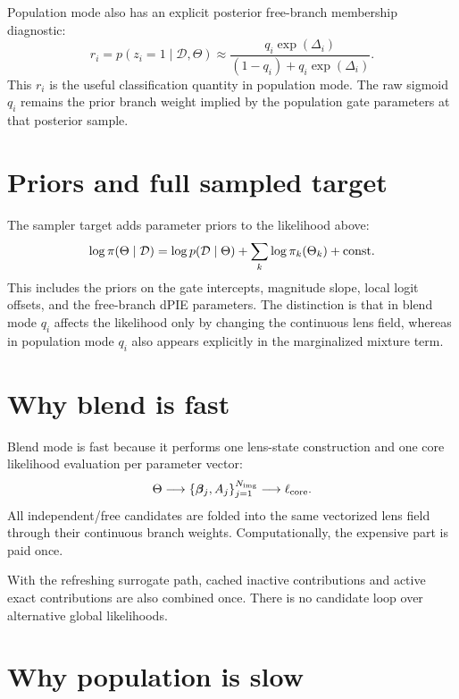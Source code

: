 \documentclass[11pt]{article}
\newcommand{\data}{\mathcal{D}}
\begin{document}
Population mode also has an explicit posterior free-branch membership
diagnostic:
\[
    r_i
    =
    p(z_i=1\mid\data,\Theta)
    \approx
    \frac{
        q_i\exp(\Delta_i)
    }{
        (1-q_i)+q_i\exp(\Delta_i)
    }.
\]
This $r_i$ is the useful classification quantity in population mode. The raw
sigmoid $q_i$ remains the prior branch weight implied by the population gate
parameters at that posterior sample.

\section{Priors and full sampled target}

The sampler target adds parameter priors to the likelihood above:
\[
    \log \pi(\Theta\mid\data)
    =
    \log p(\data\mid\Theta)
    +
    \sum_k \log \pi_k(\Theta_k)
    +
    {\rm const}.
\]
This includes the priors on the gate intercepts, magnitude slope, local logit
offsets, and the free-branch dPIE parameters. The distinction is that in blend
mode $q_i$ affects the likelihood only by changing the continuous lens field,
whereas in population mode $q_i$ also appears explicitly in the marginalized
mixture term.

\section{Why blend is fast}

Blend mode is fast because it performs one lens-state construction and one
core likelihood evaluation per parameter vector:
\[
    \Theta
    \longrightarrow
    \{\bm{\beta}_j,A_j\}_{j=1}^{N_{\rm img}}
    \longrightarrow
    \ell_{\rm core}.
\]
All independent/free candidates are folded into the same vectorized lens field
through their continuous branch weights. Computationally, the expensive part is
paid once.

With the refreshing surrogate path, cached inactive contributions and active
exact contributions are also combined once. There is no candidate loop over
alternative global likelihoods.

\section{Why population is slow}
\end{document}
